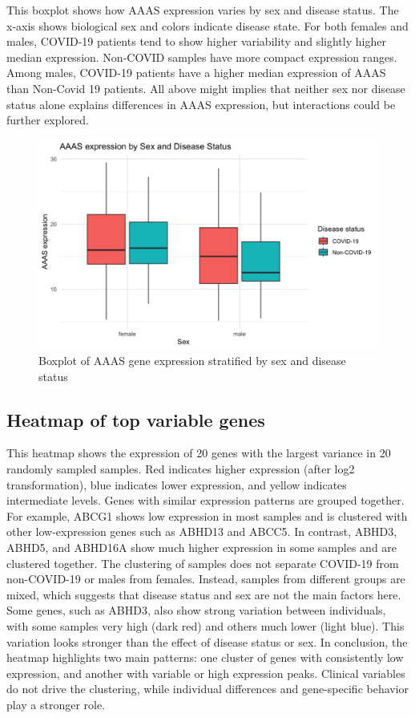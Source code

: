 \documentclass{article}
\begin{document}
This boxplot shows how AAAS expression varies by sex and disease status. The x-axis shows biological sex and colors indicate disease state. For both females and males, COVID-19 patients tend to show higher variability and slightly higher median expression. Non-COVID samples have more compact expression ranges. Among males, COVID-19 patients have a higher median expression of AAAS than Non-Covid 19 patients. All above might implies that neither sex nor disease status alone explains differences in AAAS expression, but interactions could be further explored.

\begin{figure}[H]
\centering
\includegraphics[width=0.80\linewidth]{AAAS expression by Sex and Disease Status.png}
\caption{\label{fig:boxplot}Boxplot of AAAS gene expression stratified by sex and disease status}
\end{figure}

\subsection{Heatmap of top variable genes}

This heatmap shows the expression of 20 genes with the largest variance in 20 randomly sampled samples. Red indicates higher expression (after log2 transformation), blue indicates lower expression, and yellow indicates intermediate levels. Genes with similar expression patterns are grouped together. For example, ABCG1 shows low expression in most samples and is clustered with other low-expression genes such as ABHD13 and ABCC5. In contrast, ABHD3, ABHD5, and ABHD16A show much higher expression in some samples and are clustered together. The clustering of samples does not separate COVID-19 from non-COVID-19 or males from females. Instead, samples from different groups are mixed, which suggests that disease status and sex are not the main factors here. Some genes, such as ABHD3, also show strong variation between individuals, with some samples very high (dark red) and others much lower (light blue). This variation looks stronger than the effect of disease status or sex. In conclusion, the heatmap highlights two main patterns: one cluster of genes with consistently low expression, and another with variable or high expression peaks. Clinical variables do not drive the clustering, while individual differences and gene-specific behavior play a stronger role.
\end{document}

